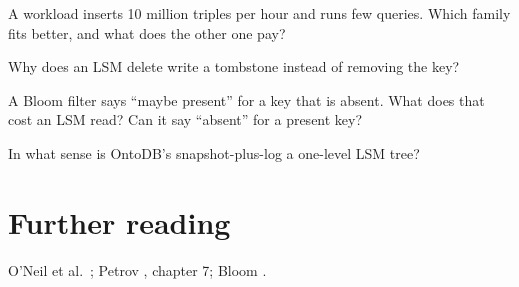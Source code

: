 \begin{checkyourself}
\item A workload inserts 10 million triples per hour and runs few queries. Which family fits better, and what does the other one pay?
\item Why does an LSM delete write a tombstone instead of removing the key?
\item A Bloom filter says ``maybe present'' for a key that is absent. What does that cost an LSM read? Can it say ``absent'' for a present key?
\item In what sense is OntoDB's snapshot-plus-log a one-level LSM tree?
\end{checkyourself}

\section*{Further reading}
O'Neil et al.\ \cite{lsm}; Petrov \cite{petrov}, chapter 7; Bloom
\cite{bloom}.
